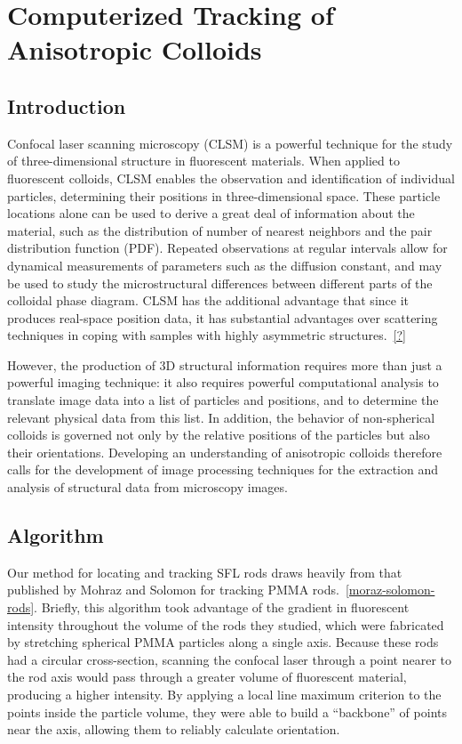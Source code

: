 \chapter{Computerized Tracking of Anisotropic Colloids}
\section{Introduction}

Confocal laser scanning microscopy (CLSM) is a powerful technique for the study of three-dimensional
structure in fluorescent materials. When applied to fluorescent colloids, CLSM enables the observation
and identification of individual particles, determining their positions in three-dimensional space.
These particle locations alone can be used to derive a great deal
of information about the material, such as the distribution of number of nearest neighbors and
the pair distribution function (PDF). Repeated observations at regular intervals allow for dynamical
measurements of parameters such as the diffusion constant, and may be used to study the microstructural
differences between different parts of the colloidal phase diagram. CLSM has the additional advantage
that since it produces real-space position data, it has substantial advantages over scattering techniques
in coping with samples with highly asymmetric structures.~\ref{?}

However, 
the production of 3D structural information requires more than just a powerful imaging technique: it also
requires powerful computational analysis to translate image data into a list of particles and positions, and
to determine the relevant physical data from this list.  In addition, the behavior of non-spherical colloids
is governed not only by the relative positions of the particles but also their orientations. Developing an
understanding of anisotropic colloids
therefore calls for the development of image processing techniques for the extraction and analysis of
structural data from microscopy images.

\section{Algorithm}
\label{sec:rod-tracking}

Our method for locating and tracking SFL rods draws heavily from that published by 
Mohraz and Solomon for tracking PMMA rods.~\ref{moraz-solomon-rods}.  Briefly, this algorithm 
took advantage of the gradient in fluorescent intensity throughout the volume of the 
rods they studied, which were fabricated by stretching spherical PMMA particles along a single axis.
Because these rods had a circular cross-section, scanning the confocal laser through a point nearer
to the rod axis would pass through a greater volume of fluorescent material, producing a higher intensity.
By applying a local line maximum criterion to the points inside the particle volume, they were able to 
build a ``backbone'' of points near the axis, allowing them to reliably calculate orientation.

